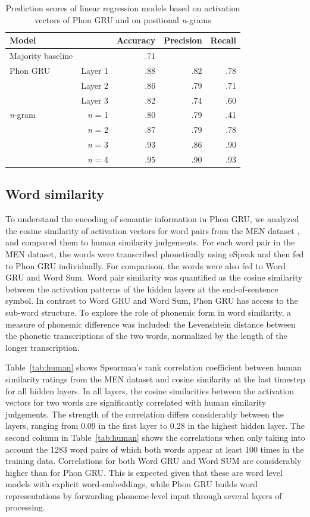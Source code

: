 \begin{table}[]
	\centering
	\begin{tabular}{lrrrr}
		\textbf{Model} & & \textbf{Accuracy} & \textbf{Precision} & \textbf{Recall} \\
		\hline
		Majority baseline & & .71 & & \\
		\hline
		Phon GRU & Layer 1 & .88 & .82 & .78 \\
		& Layer 2 & .86 & .79 & .71 \\
		& Layer 3 &  .82 & .74 & .60 \\
		\hline
		\textit{n}-gram & \textit{n} = 1 & .80 & .79 & .41 \\
		& \textit{n} = 2 & .87 & .79 & .78 \\
		& \textit{n} = 3 & .93 & .86 & .90 \\
		& \textit{n} = 4 & .95 & .90 & .93
	\end{tabular}
	\caption{Prediction scores of linear regression models based on activation vectors of {\sc Phon GRU} and on positional \textit{n}-grams}
\label{tab:boundary}
\end{table}

\subsection{Word similarity}
To understand the encoding of semantic information in {\sc Phon GRU}, we analyzed the cosine similarity of activation vectors for word pairs from the MEN dataset \cite{bruni2014multimodal}, and compared them to human similarity judgements.
For each word pair in the MEN dataset, the words were transcribed phonetically using eSpeak and then fed to {\sc Phon GRU} individually. For comparison, the words were also fed to {\sc Word GRU} and {\sc Word Sum}. Word pair similarity was quantified as the cosine similarity between the activation patterns of the hidden layers at the end-of-sentence symbol.
In contrast to {\sc Word GRU} and {\sc Word Sum}, {\sc Phon GRU} has access to the sub-word structure. To explore the role of phonemic form in word similarity, a measure of phonemic difference was included: the Levenshtein distance between the phonetic transcriptions of the two words, normalized by  the length of the longer transcription. 

Table~\ref{tab:human} shows Spearman's rank correlation coefficient between human similarity ratings from the MEN dataset and cosine similarity at the last timestep for all hidden layers. In all layers, the cosine similarities between the activation vectors for two words are significantly correlated with human similarity judgements. The strength of the correlation differs considerably between the layers, ranging from 0.09 in the first layer to 0.28 in the highest hidden layer. The second column in Table~\ref{tab:human} shows the correlations when only taking into account the 1283 word pairs of which both words appear at least 100 times in the training data. 
Correlations for both {\sc Word GRU} and {\sc Word SUM} are considerably higher than for {\sc Phon GRU}. This is expected given that these are word level models with explicit word-embeddings, while {\sc Phon GRU} builds word representations by forwarding phoneme-level input through several layers of processing.

